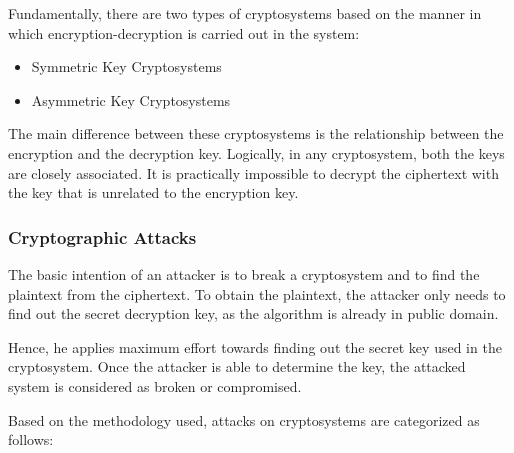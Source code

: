 \documentclass[11pt]{article}
\providecommand{\tightlist}{%
      \setlength{\itemsep}{0pt}\setlength{\parskip}{0pt}}
\begin{document}
Fundamentally, there are two types of cryptosystems based on the manner
in which encryption-decryption is carried out in the system:

\begin{itemize}
\tightlist
\item
  Symmetric Key Cryptosystems
\item
  Asymmetric Key Cryptosystems
\end{itemize}

The main difference between these cryptosystems is the relationship
between the encryption and the decryption key. Logically, in any
cryptosystem, both the keys are closely associated. It is practically
impossible to decrypt the ciphertext with the key that is unrelated to
the encryption key.

\hypertarget{cryptographic-attacks}{%
\subsubsection{Cryptographic Attacks}\label{cryptographic-attacks}}

The basic intention of an attacker is to break a cryptosystem and to
find the plaintext from the ciphertext. To obtain the plaintext, the
attacker only needs to find out the secret decryption key, as the
algorithm is already in public domain.

Hence, he applies maximum effort towards finding out the secret key used
in the cryptosystem. Once the attacker is able to determine the key, the
attacked system is considered as broken or compromised.

Based on the methodology used, attacks on cryptosystems are categorized
as follows:
\end{document}
